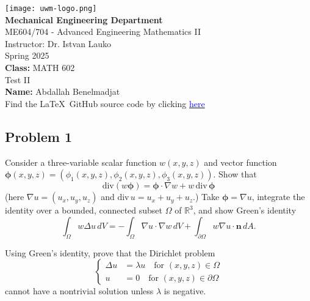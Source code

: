\documentclass{article}
\date{}
\begin{document}
\begin{titlepage}
    \centering
    \texttt{[image: uwm-logo.png]} \\[1cm]
    
    {\Large \textbf{Mechanical Engineering Department}}\\[0.5em]
    {\large ME604/704 - Advanced Engineering Mathematics II}\\[0.5em]
    {\large Instructor: Dr. Istvan Lauko}\\[0.5em]
    {\large Spring 2025}\\[2cm]
    
    {\large \textbf{Class:} MATH 602}\\[0.5em]
    {\large \textbf{} Test II}\\[0.5em]
    {\large \textbf{Name:} Abdallah Benelmadjat}\\[0.5em]
    {\large Find the \LaTeX\ GitHub source code by clicking \href{https://github.com/abdallah-benelmadjat/MATH-602/blob/main/HW4.tex}{\textcolor{blue}{here}}}\\
\end{titlepage}


\newpage

\begin{tcolorbox}[colback=white, colframe=black, boxrule=0.8pt, arc=2mm]
\section*{Problem 1}
Consider a three-variable scalar function $w(x,y,z)$ and vector function $\boldsymbol{\phi}(x,y,z) = (\phi_1(x,y,z), \phi_2(x,y,z), \phi_3(x,y,z))$. Show that
\[
\text{div}(w\boldsymbol{\phi}) = \boldsymbol{\phi} \cdot \nabla w + w \, \text{div} \, \boldsymbol{\phi}
\]
(here $\nabla u = (u_x, u_y, u_z)$ and $\text{div} \, u = u_x + u_y + u_z$.) Take $\boldsymbol{\phi} = \nabla u$, integrate the identity over a bounded, connected subset $\Omega$ of $\mathbb{R}^3$, and show Green’s identity
\[
\int_{\Omega} w \Delta u \, dV = - \int_{\Omega} \nabla u \cdot \nabla w \, dV + \int_{\partial \Omega} w \nabla u \cdot \mathbf{n} \, dA.
\]

Using Green’s identity, prove that the Dirichlet problem
\[
\left\{
\begin{aligned}
\Delta u &= \lambda u \quad \text{for } (x,y,z) \in \Omega \\
u &= 0 \quad \text{for } (x,y,z) \in \partial \Omega
\end{aligned}
\right.
\]
cannot have a nontrivial solution unless $\lambda$ is negative.

\end{tcolorbox}
\end{document}
